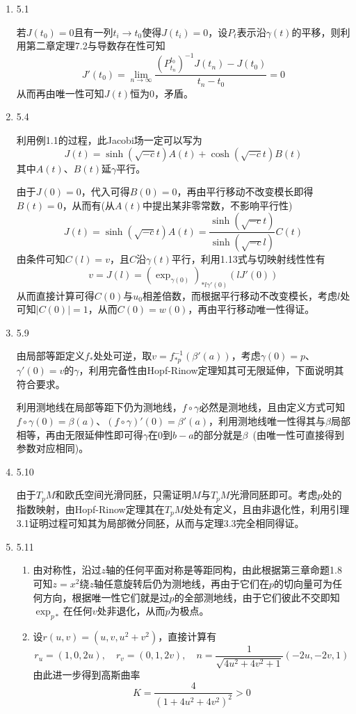 \documentclass[a4paper,UTF8,fontset=windows,10pt]{ctexart}
\begin{document}
\begin{enumerate}
    \item 5.1
    
    若$J(t_0)=0$且有一列$t_i\to t_0$使得$J(t_i)=0$，设$P_t$表示沿$\gamma(t)$的平移，则利用第二章定理7.2与导数存在性可知
    $$J'(t_0)=\lim_{n\to\infty}\frac{(P_{t_n}^{t_0})^{-1}J(t_n)-J(t_0)}{t_n-t_0}=0$$
    从而再由唯一性可知$J(t)$恒为0，矛盾。
    
    \item 5.4
    
    利用例1.1的过程，此Jacobi场一定可以写为
    $$J(t)=\sinh(\sqrt{-c}t)A(t)+\cosh(\sqrt{-c}t)B(t)$$
    其中$A(t)$、$B(t)$延$\gamma$平行。
    
    由于$J(0)=0$，代入可得$B(0)=0$，再由平行移动不改变模长即得$B(t)=0$，从而有(从$A(t)$中提出某非零常数，不影响平行性)
    $$J(t)=\sinh(\sqrt{-c}t)A(t)=\frac{\sinh(\sqrt{-c}t)}{\sinh(\sqrt{-c}l)}C(t)$$
    由条件可知$C(l)=v$，且$C$沿$\gamma(t)$平行，利用1.13式与切映射线性性有
    $$v=J(l)=(\exp_{\gamma(0)})_{*l\gamma'(0)}(lJ'(0))$$
    从而直接计算可得$C(0)$与$u_0$相差倍数，而根据平行移动不改变模长，考虑$l$处可知$|C(0)|=1$，从而$C(0)=w(0)$，再由平行移动唯一性得证。
    
    \item 5.9
    
    由局部等距定义$f_*$处处可逆，取$v=f_{*p}^{-1}(\beta'(a))$，考虑$\gamma(0)=p$、$\gamma'(0)=v$的$\gamma$，利用完备性由Hopf-Rinow定理知其可无限延伸，下面说明其符合要求。
    
    利用测地线在局部等距下仍为测地线，$f\circ\gamma$必然是测地线，且由定义方式可知$f\circ\gamma(0)=\beta(a)$、$(f\circ\gamma)'(0)=\beta'(a)$，利用测地线唯一性得其与$\beta$局部相等，再由无限延伸性即可得$\gamma$在0到$b-a$的部分就是$\beta$\ (由唯一性可直接得到参数对应相同)。
    
    \item 5.10
    
    由于$T_pM$和欧氏空间光滑同胚，只需证明$M$与$T_pM$光滑同胚即可。考虑$p$处的指数映射，由Hopf-Rinow定理其在$T_pM$处处有定义，且由非退化性，利用引理3.1证明过程可知其为局部微分同胚，从而与定理3.3完全相同得证。
    
    \item 5.11
    \begin{enumerate}[(1)]
        \item 由对称性，沿过$z$轴的任何平面对称是等距同构，由此根据第三章命题1.8可知$z=x^2$绕$z$轴任意旋转后仍为测地线，再由于它们在$p$的切向量可为任何方向，根据唯一性它们就是过$p$的全部测地线，由于它们彼此不交即知$\exp_{p*}$在任何$v$处非退化，从而$p$为极点。
        \item 设$r(u,v)=(u,v,u^2+v^2)$，直接计算有
        $$r_u=(1,0,2u),\quad r_v=(0,1,2v),\quad n=\frac{1}{\sqrt{4u^2+4v^2+1}}(-2u,-2v,1)$$
        由此进一步得到高斯曲率
        $$K=\frac{4}{(1+4u^2+4v^2)^2}>0$$
    \end{enumerate}
    

\end{enumerate}
\end{document}

